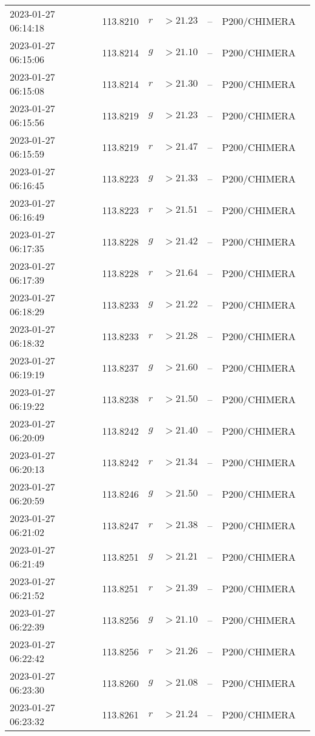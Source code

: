 \documentclass{nature_plusfigure}
\begin{document}
\begin{supplement}
\begin{center}
\begin{longtable}{lllllll}
2023-01-27 06:14:18 & 113.8210 & $r$ & $>21.23$ & -- & P200/CHIMERA &  \\ 
2023-01-27 06:15:06 & 113.8214 & $g$ & $>21.10$ & -- & P200/CHIMERA &  \\ 
2023-01-27 06:15:08 & 113.8214 & $r$ & $>21.30$ & -- & P200/CHIMERA &  \\ 
2023-01-27 06:15:56 & 113.8219 & $g$ & $>21.23$ & -- & P200/CHIMERA &  \\ 
2023-01-27 06:15:59 & 113.8219 & $r$ & $>21.47$ & -- & P200/CHIMERA &  \\ 
2023-01-27 06:16:45 & 113.8223 & $g$ & $>21.33$ & -- & P200/CHIMERA &  \\ 
2023-01-27 06:16:49 & 113.8223 & $r$ & $>21.51$ & -- & P200/CHIMERA &  \\ 
2023-01-27 06:17:35 & 113.8228 & $g$ & $>21.42$ & -- & P200/CHIMERA &  \\ 
2023-01-27 06:17:39 & 113.8228 & $r$ & $>21.64$ & -- & P200/CHIMERA &  \\ 
2023-01-27 06:18:29 & 113.8233 & $g$ & $>21.22$ & -- & P200/CHIMERA &  \\ 
2023-01-27 06:18:32 & 113.8233 & $r$ & $>21.28$ & -- & P200/CHIMERA &  \\ 
2023-01-27 06:19:19 & 113.8237 & $g$ & $>21.60$ & -- & P200/CHIMERA &  \\ 
2023-01-27 06:19:22 & 113.8238 & $r$ & $>21.50$ & -- & P200/CHIMERA &  \\ 
2023-01-27 06:20:09 & 113.8242 & $g$ & $>21.40$ & -- & P200/CHIMERA &  \\ 
2023-01-27 06:20:13 & 113.8242 & $r$ & $>21.34$ & -- & P200/CHIMERA &  \\ 
2023-01-27 06:20:59 & 113.8246 & $g$ & $>21.50$ & -- & P200/CHIMERA &  \\ 
2023-01-27 06:21:02 & 113.8247 & $r$ & $>21.38$ & -- & P200/CHIMERA &  \\ 
2023-01-27 06:21:49 & 113.8251 & $g$ & $>21.21$ & -- & P200/CHIMERA &  \\ 
2023-01-27 06:21:52 & 113.8251 & $r$ & $>21.39$ & -- & P200/CHIMERA &  \\ 
2023-01-27 06:22:39 & 113.8256 & $g$ & $>21.10$ & -- & P200/CHIMERA &  \\ 
2023-01-27 06:22:42 & 113.8256 & $r$ & $>21.26$ & -- & P200/CHIMERA &  \\ 
2023-01-27 06:23:30 & 113.8260 & $g$ & $>21.08$ & -- & P200/CHIMERA &  \\ 
2023-01-27 06:23:32 & 113.8261 & $r$ & $>21.24$ & -- & P200/CHIMERA &  \\ 

\end{longtable}
\end{center}
\end{supplement}
\end{document}

